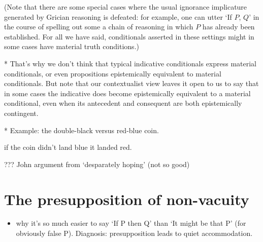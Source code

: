 \documentclass[If.tex]{subfiles}
\begin{document}
(Note that there are some special cases where the usual ignorance implicature generated by Grician reasoning is defeated: for example, one can utter ‘If $P$, $Q$’ in the course of spelling out some a chain of reasoning in which $P$ has already been established.  For all we have said, conditionals asserted in these settings might in some cases have material truth conditions.)



* That's why we don't think that typical indicative conditionals express material conditionals, or even propositions epistemically equivalent to material conditionals.  But note that our contextualist view leaves it open to us to say that in some cases the indicative does become epistemically equivalent to a material conditional, even when its antecedent and consequent are both epistemically contingent.  

* Example: the double-black versus red-blue coin.  
\begin{prop}
	 if the coin didn't land blue it landed red.
\end{prop}
??? John argument from ‘desparately hoping’ (not so good)


\section{The presupposition of non-vacuity}
\label{sect:nonvacuity}
\begin{itemize} 
	\item
	why it's so much easier to say ‘If P then Q’ than ‘It might be that P’ (for obviously false P). Diagnosis: presupposition leads to quiet accommodation.
\end{itemize}

%
\end{document}
